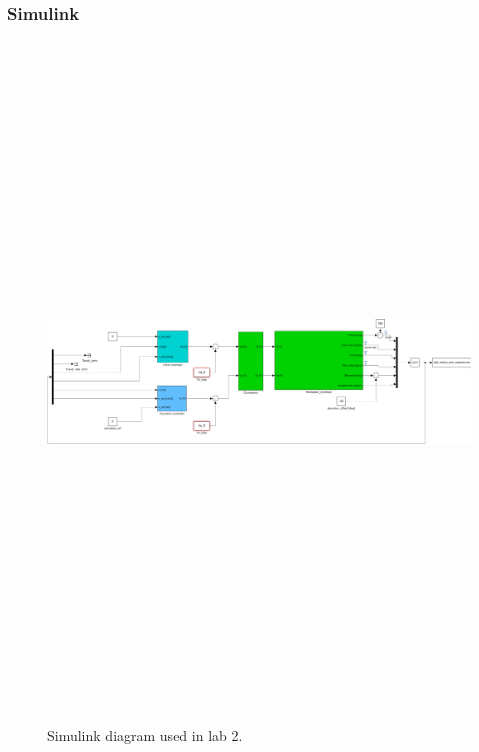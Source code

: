 \documentclass[../main.tex]{subfiles}
\begin{document}
\subsubsection{Simulink}
\begin{figure}[h]
	\centering
	\includegraphics[angle=90, height=180mm]{code/lab2_simulink}
	\caption{Simulink diagram used in lab 2.}
	\label{fig:lab2_simulink}
\end{figure}
\end{document}
